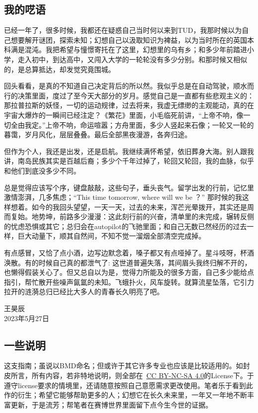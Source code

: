 \subsection{我的呓语}
已经一年了，很多时候，我都还在疑惑自己当时何以来到TUD，我那时候以为自己想要解开谜团，探索未知；幻想自己以汲取知识为裨益，以为当时所在的英国本科满是混沌。我把希望与憧憬寄托在了这里，幻想里的乌有乡；和多少年前踏进小学，走入初中，到达高中，又闯入大学的一轮轮没有多少分别。和那时候又相似的，是总算抵达，却发觉究竟围城。

回头看看，是真的不知道自己决定背后的所以然。我似乎总是在自动驾驶，顺水而行的决策里面，度过了至今天大部分的岁月。感觉自己是一直都有些悲观主义的：那拉普拉斯的妖怪，一切的运动规律，过去将来，我虚无缥缈的主观能动，真的在宇宙大爆炸的一瞬间已经注定？《繁花》里面，小毛临死前讲，“上帝不响，像一切全由我定。”上帝不响，命运喧嚣；方舟里面，多少人竖起来石像；一轮又一轮的暮霭，岁月风化，层层叠叠。最后全部黑夜漫游，各奔归途。

但作为个人，我还是出发，还是启航。我继续满怀希望，依旧葬身大海。别人跟我讲，南岛民族其实是百越后裔；多少个千年过掉了，轮回又轮回，我的血脉，似乎和他们到底没多少不同。

总是觉得应该写个序，键盘敲敲，这些句子，垂头丧气。留学出发的行前，记忆里激情澎湃，几多焦虑；“This time tomorrow, where will we be ？” 那时候的我这样想着。如今的我回头望望，一天一天，过去的未来，浑芒光晕拨开，其实还是周而复始。地势坤，前路多少漫漫：这此刻行前的兴奋，清单里的未完成，辗转反侧的忧虑恐惧或其它；总归会在autopilot的飞驰里面；和自己无数已然经历的过去一样，巨大动量下，顺其自然间，不知不觉一溜烟全部清空完成掉。

有点感冒，又恰了点小酒，边写边默念着，嗓子都又有点哑掉了。星斗吱呀，杯酒涣散。有的时候自己真的都泄气了: 这世道普遍失落，其间眉头我终归解不开的，也懒得假装关心了。但又总自以为是，觉得力所能及的很多方面，自己多少能给点指引，帮忙散开些噪声氤氲的未知。飞蛾扑火，风车旋转。就算流星坠落，它引力拉开的涟漪总归已经比大多人的青春长久明亮了吧。

\vspace*{\fill}
\begin{flushright}
王昊辰\\
2023年5月27日
\end{flushright}

\newpage\subsection{一些说明}
这支指南；虽说以BMD命名；但或许于其它许多专业也应该是比较适用的。如封皮所言，所有内容，若非特地说明，则全部在\ccbyncsa\ \href{http://creativecommons.org/licenses/by-nc-sa/4.0/}{\uline{CC BY-NC-SA 4.0}}的License下。于遵守license要求的情境里，还请随意按照自己意愿需求更改使用。笔者乐于看到此作的衍生；希望它能够帮助更多的人；幻想它在长久未来里，一年又一年地不断丰富更新，于是流芳；帮笔者在赛博世界里面留下点今生今世的证据。

